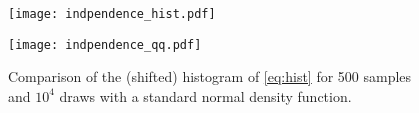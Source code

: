 \documentclass[10pt]{amsart}
\begin{document}
\begin{appendix}
\begin{figure}[h!]
\begin{center}
\begin{minipage}{0.48\textwidth}
\texttt{[image: indpendence\_hist.pdf]}
\end{minipage}
\quad
\begin{minipage}{0.48\textwidth}
\texttt{[image: indpendence\_qq.pdf]}
\end{minipage}
\caption{Comparison of the (shifted) histogram of \eqref{eq:hist} for 500 samples and $10^4$ draws with a standard normal density function.}\label{fig:hist}
\end{center}
\end{figure}
\end{appendix}
\end{document}
